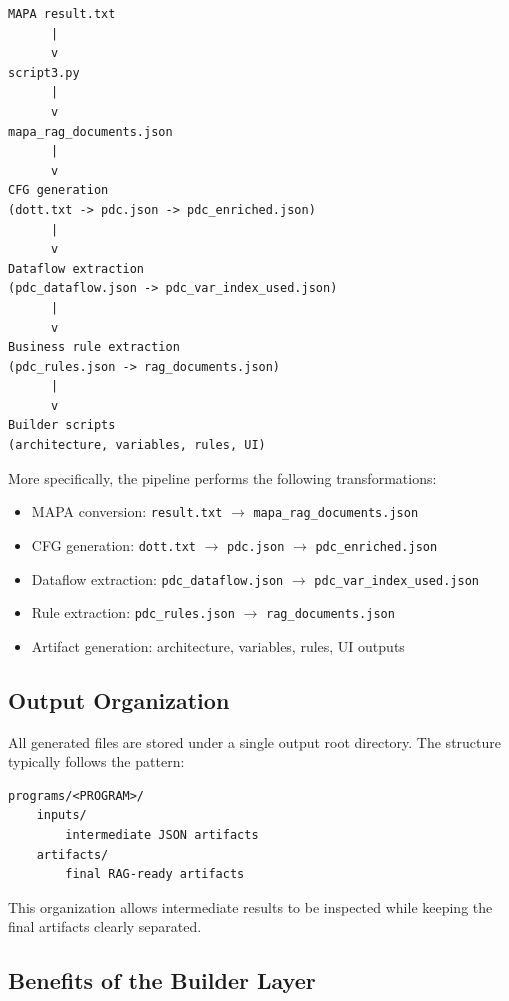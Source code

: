 \documentclass[11pt]{article}
\begin{document}
\begin{center}
\begin{verbatim}
MAPA result.txt
      |
      v
script3.py
      |
      v
mapa_rag_documents.json
      |
      v
CFG generation
(dott.txt -> pdc.json -> pdc_enriched.json)
      |
      v
Dataflow extraction
(pdc_dataflow.json -> pdc_var_index_used.json)
      |
      v
Business rule extraction
(pdc_rules.json -> rag_documents.json)
      |
      v
Builder scripts
(architecture, variables, rules, UI)
\end{verbatim}
\end{center}

More specifically, the pipeline performs the following transformations:

\begin{itemize}
\item MAPA conversion: \texttt{result.txt} $\rightarrow$ \texttt{mapa\_rag\_documents.json}
\item CFG generation: \texttt{dott.txt} $\rightarrow$ \texttt{pdc.json} $\rightarrow$ \texttt{pdc\_enriched.json}
\item Dataflow extraction: \texttt{pdc\_dataflow.json} $\rightarrow$ \texttt{pdc\_var\_index\_used.json}
\item Rule extraction: \texttt{pdc\_rules.json} $\rightarrow$ \texttt{rag\_documents.json}
\item Artifact generation: architecture, variables, rules, UI outputs
\end{itemize}

\subsection*{Output Organization}

All generated files are stored under a single output root directory. The structure typically follows the pattern:

\begin{verbatim}
programs/<PROGRAM>/
    inputs/
        intermediate JSON artifacts
    artifacts/
        final RAG-ready artifacts
\end{verbatim}

This organization allows intermediate results to be inspected while keeping the final artifacts clearly separated.

\subsection*{Benefits of the Builder Layer}
\end{document}
